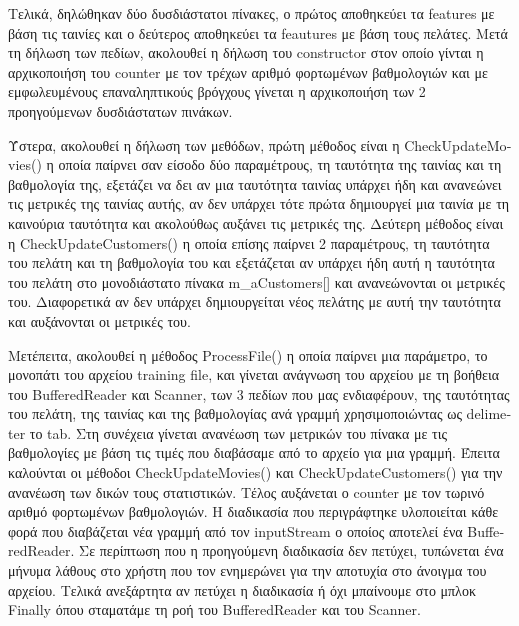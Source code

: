 \documentclass{report}
\begin{document}
Τελικά, δηλώθηκαν δύο δυσδιάστατοι πίνακες, ο πρώτος αποθηκεύει τα \textlatin{features} με βάση τις ταινίες και ο δεύτερος αποθηκεύει τα \textlatin{feautures} με  βάση τους πελάτες. Μετά τη δήλωση των πεδίων, ακολουθεί η δήλωση του \textlatin{constructor} στον οποίο γίνται η αρχικοποιήση του \textlatin{counter} με τον τρέχων αριθμό φορτωμένων βαθμολογιών και με εμφωλευμένους επαναληπτικούς βρόγχους γίνεται η αρχικοποιήση των 2 προηγούμενων δυσδιάστατων πινάκων.

Ύστερα, ακολουθεί η δήλωση των μεθόδων, πρώτη μέθοδος είναι η \textlatin{CheckUpdateMovies}() η οποία παίρνει σαν είσοδο δύο παραμέτρους, τη ταυτότητα της ταινίας και τη βαθμολογία της, εξετάζει να δει αν μια ταυτότητα ταινίας υπάρχει ήδη και ανανεώνει τις μετρικές της ταινίας αυτής, αν δεν υπάρχει τότε πρώτα δημιουργεί μια ταινία με τη καινούρια ταυτότητα και ακολούθως αυξάνει τις μετρικές της. Δεύτερη μέθοδος είναι η \textlatin{CheckUpdateCustomers}() η οποία επίσης παίρνει 2 παραμέτρους, τη ταυτότητα του πελάτη και τη βαθμολογία του και εξετάζεται αν υπάρχει ήδη αυτή η ταυτότητα του πελάτη στο μονοδιάστατο πίνακα \textlatin{m\_aCustomers}[] και ανανεώνονται οι μετρικές του. Διαφορετικά αν δεν υπάρχει δημιουργείται νέος πελάτης με αυτή την ταυτότητα και αυξάνονται οι μετρικές του.

Μετέπειτα, ακολουθεί η μέθοδος \textlatin{ProcessFile}() η οποία παίρνει μια παράμετρο, το μονοπάτι του αρχείου \textlatin{training file}, και γίνεται ανάγνωση του αρχείου με τη βοήθεια του \textlatin{BufferedReader} και \textlatin{Scanner}, των 3 πεδίων που μας ενδιαφέρουν, της ταυτότητας του πελάτη, της ταινίας και της βαθμολογίας ανά γραμμή χρησιμοποιώντας ως \textlatin{delimeter} το \textlatin{tab}. Στη συνέχεια γίνεται ανανέωση των μετρικών του πίνακα με τις βαθμολογίες με βάση τις τιμές που διαβάσαμε από το αρχείο για μια γραμμή. Έπειτα καλούνται οι μέθοδοι \textlatin{CheckUpdateMovies}() και \textlatin{CheckUpdateCustomers}() για την ανανέωση των δικών τους στατιστικών. Τέλος αυξάνεται ο \textlatin{counter} με τον τωρινό αριθμό φορτωμένων βαθμολογιών. Η διαδικασία που περιγράφτηκε υλοποιείται κάθε φορά που διαβάζεται νέα γραμμή από τον \textlatin{inputStream} ο οποίος αποτελεί ένα \textlatin{BufferedReader}. Σε περίπτωση που η προηγούμενη διαδικασία δεν πετύχει, τυπώνεται ένα μήνυμα λάθους στο χρήστη που τον ενημερώνει για την αποτυχία στο άνοιγμα του αρχείου. Τελικά ανεξάρτητα αν πετύχει η διαδικασία ή όχι μπαίνουμε στο μπλοκ \textlatin{Finally} όπου σταματάμε τη ροή του \textlatin{BufferedReader} και του \textlatin{Scanner}. 
\end{document}
